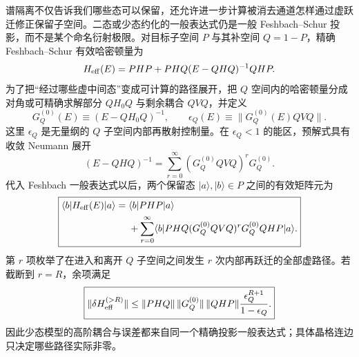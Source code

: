 谱隔离不仅告诉我们哪些态可以保留，还允许进一步计算被消去通道怎样通过虚跃迁修正保留子空间。二态或少态约化的一般表达式仍是一般 Feshbach--Schur 投影，而不是某个命名衍射极限。对目标子空间 $P$ 与其补空间 $Q=1-P$，精确 Feshbach--Schur 有效哈密顿量为
\begin{equation*}
 H_{\rm eff}(E)
 =PHP+PHQ(E-QHQ)^{-1}QHP.
\end{equation*}
为了把“经过哪些虚中间态”变成可计算的路径展开，把 $Q$ 空间内的哈密顿量分成对角或可精确求解部分 $QH_0Q$ 与剩余耦合 $QVQ$，并定义
\begin{equation}
 \boxed{
 G_Q^{(0)}(E)\equiv(E-QH_0Q)^{-1},
 \qquad
 \epsilon_Q(E)\equiv\|G_Q^{(0)}(E)QVQ\|.}
 \label{eq:virtual-path-resolvent-control-dp85}
\end{equation}
这里 $\epsilon_Q$ 是无量纲的 $Q$ 子空间内部再散射控制量。在 $\epsilon_Q<1$ 的能区，预解式具有收敛 Neumann 展开
\begin{equation}
 \boxed{
 (E-QHQ)^{-1}
 =\sum_{r=0}^{\infty}\left(G_Q^{(0)}QVQ\right)^rG_Q^{(0)}.}
 \label{eq:virtual-path-neumann-dp85}
\end{equation}
代入 Feshbach 一般表达式以后，两个保留态 $|a\rangle,|b\rangle\in P$ 之间的有效矩阵元为
\begin{equation}
 \boxed{
 \begin{aligned}
 \langle b|H_{\rm eff}(E)|a\rangle
 ={}&\langle b|PHP|a\rangle\\
 &+\sum_{r=0}^{\infty}
 \langle b|PHQ
 (G_Q^{(0)}QVQ)^rG_Q^{(0)}QHP|a\rangle .
 \end{aligned}}
 \label{eq:virtual-path-general-series-dp85}
\end{equation}
第 $r$ 项枚举了在进入和离开 $Q$ 子空间之间发生 $r$ 次内部再跃迁的全部虚路径。若截断到 $r=R$，余项满足
\begin{equation}
 \boxed{
 \|\delta H_{\rm eff}^{(>R)}\|
 \le
 \|PHQ\|\,\|G_Q^{(0)}\|\,\|QHP\|
 \frac{\epsilon_Q^{R+1}}{1-\epsilon_Q}.}
 \label{eq:virtual-path-remainder-bound-dp85}
\end{equation}
因此少态模型的高阶耦合与误差都来自同一个精确投影一般表达式；具体晶格连边只决定哪些路径实际非零。


